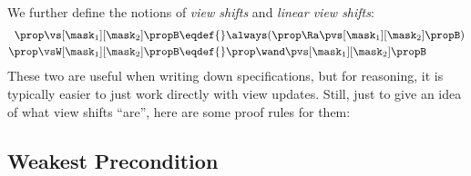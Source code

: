 We further define the notions of \emph{view shifts} and \emph{linear view shifts}:
\begin{align*}
  \prop \vs[\mask_1][\mask_2] \propB \eqdef{}& \always(\prop \Ra \pvs[\mask_1][\mask_2] \propB) \\
  \prop \vsW[\mask_1][\mask_2] \propB \eqdef{}& \prop \wand \pvs[\mask_1][\mask_2] \propB
\end{align*}
These two are useful when writing down specifications, but for reasoning, it is typically easier to just work directly with view updates.
Still, just to give an idea of what view shifts ``are'', here are some proof rules for them:

\subsection{Weakest Precondition}

